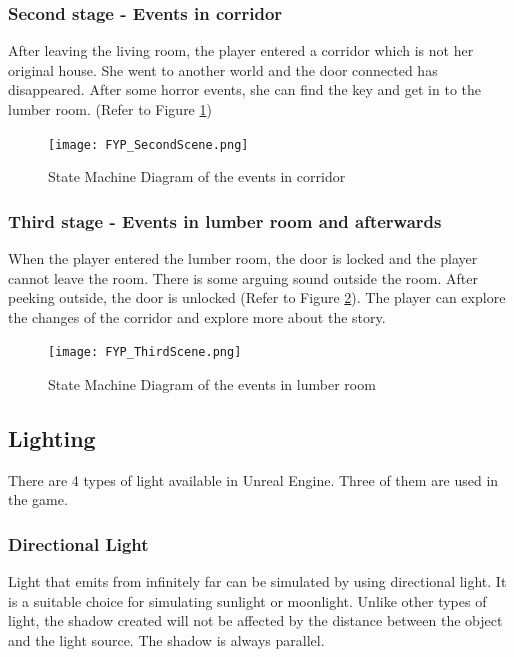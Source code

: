\documentclass{article}
\begin{document}
\clearpage
\subsubsection{Second stage - Events in corridor}
After leaving the living room, the player entered a corridor which is not her original house. She went to another world and the door connected has disappeared. After some horror events, she can find the key and get in to the lumber room. (Refer to Figure \ref{fig:FYP_SecondScene})\par
\bigskip

\begin{figure}[hp!]
\centering
\texttt{[image: FYP\_SecondScene.png]}
\caption{State Machine Diagram of the events in corridor}
\label{fig:FYP_SecondScene}
\end{figure}

\clearpage
\subsubsection{Third stage - Events in lumber room and afterwards}
When the player entered the lumber room, the door is locked and the player cannot leave the room. There is some arguing sound outside the room. After peeking outside, the door is unlocked (Refer to Figure \ref{fig:FYP_ThirdScene}). The player can explore the changes of the corridor and explore more about the story. \par
\bigskip
\begin{figure}[hp!]
\centering
\texttt{[image: FYP\_ThirdScene.png]}
\caption{State Machine Diagram of the events in lumber room}
\label{fig:FYP_ThirdScene}
\end{figure}
\clearpage

\subsection{Lighting}
There are 4 types of light available in Unreal Engine. Three of them are used in the game.

\subsubsection{Directional Light}
Light that emits from infinitely far can be simulated by using directional light. It is a suitable choice for simulating sunlight or moonlight. Unlike other types of light, the shadow created will not be affected by the distance between the object and the light source. The shadow is always parallel. \\
\end{document}
